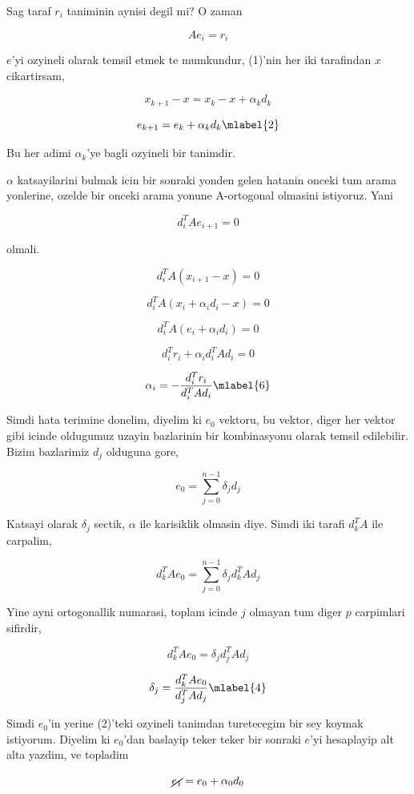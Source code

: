\documentclass[12pt,fleqn]{article}\usepackage{../common}
\begin{document}
Sag taraf $r_i$ taniminin aynisi degil mi? O zaman 

\begin{equation}\label{5}
Ae_i = r_i 
\end{equation}

$e$'yi ozyineli olarak temsil etmek te mumkundur, (1)'nin her iki
tarafindan $x$ cikartirsam, 

\[ x_{k+1} - x = x_k - x + \alpha_k d_{k} \]

\[ e_{k+1} = e_k + \alpha_k d_k 
\mlabel{2}
\]

Bu her adimi $\alpha_k$'ye bagli ozyineli bir tanimdir. 

$\alpha$ katsayilarini bulmak icin bir sonraki yonden gelen hatanin onceki
tum arama yonlerine, ozelde bir onceki arama yonune A-ortogonal
olmasini istiyoruz. Yani

\[ d_i^TA e_{i+1}  = 0\]

olmali. 

\[ d_i^TA (x_{i+1}-x)  = 0\]

\[ d_i^TA (x_{i} + \alpha_i d_i -x)  = 0\]

\[ d_i^TA (e_i + \alpha_i d_i )  = 0\]

\[ d_i^Tr_i + \alpha_i d_i^TA d_i   = 0\]

\[ \alpha_i = -\frac{ d_i^Tr_i}{d_i^T A d_i} 
\mlabel{6}
\]

Simdi hata terimine donelim, diyelim ki $e_0$ vektoru, bu vektor, diger
her vektor gibi icinde oldugumuz uzayin bazlarinin bir kombinasyonu olarak
temsil edilebilir. Bizim bazlarimiz $d_j$ olduguna gore, 

\[ e_0 = \sum _{ j=0}^{n-1} \delta_j d_j \]

Katsayi olarak $\delta_j$ sectik, $\alpha$ ile karisiklik olmasin
diye. Simdi iki tarafi $d_k^T A$ ile carpalim, 

\[ d_k^T A e_0 = \sum _{ j=0}^{n-1} \delta_j d_k^T A d_j \]

Yine ayni ortogonallik numarasi, toplam icinde $j$ olmayan tum diger $p$
carpimlari sifirdir, 

\[ d_k^T A e_0 =  \delta_j d_j^T A d_j \]

\[ \delta_j = \frac{ d_k^T A e_0}{ d_j^T A d_j } 
\mlabel{4}
\]

Simdi $e_0$'in yerine (2)'teki ozyineli tanimdan turetecegim bir sey koymak
istiyorum. Diyelim ki $e_0$'dan baslayip teker teker bir sonraki $e$'yi
hesaplayip alt alta yazdim, ve topladim

\[ \cancel{e_{1}} = e_0 + \alpha_0 d_0\]
\end{document}
